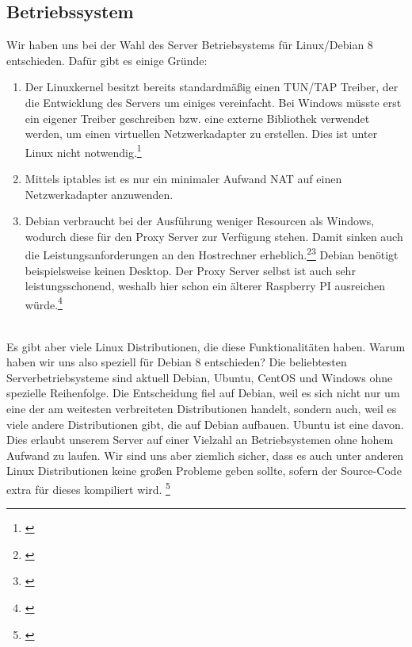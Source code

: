 \subsection{Betriebssystem}
Wir haben uns bei der Wahl des Server Betriebsystems für Linux/Debian 8 entschieden. Dafür gibt es einige Gründe:
\\
\begin{enumerate}
    \item Der Linuxkernel besitzt bereits standardmäßig einen TUN/TAP Treiber, der die Entwicklung des Servers um einiges vereinfacht. Bei Windows müsste erst ein eigener Treiber geschreiben bzw. eine externe Bibliothek verwendet werden, um einen virtuellen Netzwerkadapter zu erstellen. Dies ist unter Linux nicht notwendig.\footnote[1]{\cite[Vgl.][]{SRV2}}
    \item Mittels iptables ist es nur ein minimaler Aufwand NAT auf einen Netzwerkadapter anzuwenden. 
    \item Debian verbraucht bei der Ausführung weniger Resourcen als Windows, wodurch diese für den Proxy Server zur Verfügung stehen. Damit sinken auch die Leistungsanforderungen an den Hostrechner erheblich.\footnote[2]{\cite[Vgl.][]{SRV21}}\footnote[3]{\cite[Vgl.][]{SRV22}} Debian benötigt beispielsweise keinen Desktop. Der Proxy Server selbst ist auch sehr leistungsschonend, weshalb hier schon ein älterer Raspberry PI ausreichen würde.\footnote[4]{\cite[Vgl.][]{SRV3}}
\end{enumerate}
\ \\
Es gibt aber viele Linux Distributionen, die diese Funktionalitäten haben. Warum haben wir uns also speziell für Debian 8 entschieden? Die beliebtesten Serverbetriebsysteme sind aktuell Debian, Ubuntu, CentOS und Windows ohne spezielle Reihenfolge. Die Entscheidung fiel auf Debian, weil es sich nicht nur um eine der am weitesten verbreiteten Distributionen handelt, sondern auch, weil es viele andere Distributionen gibt, die auf Debian aufbauen. Ubuntu ist eine davon. Dies erlaubt unserem Server auf einer Vielzahl an Betriebsystemen ohne hohem Aufwand zu laufen. Wir sind uns aber ziemlich sicher, dass es auch unter anderen Linux Distributionen keine großen Probleme geben sollte, sofern der Source-Code extra für dieses kompiliert wird. \footnote[5]{\cite[Vgl.][]{SRV1}}

